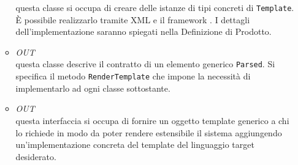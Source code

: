 \begin{itemize}
\begin{itemize}
questa classe si occupa di creare delle istanze di tipi concreti di \texttt{Template}. È possibile realizzarlo tramite XML e il framework \spring. I dettagli dell'implementazione saranno spiegati nella Definizione di Prodotto. %
\item \textit{OUT} \hyperref[\nogloxy{SWEDesigner::Server::Project::ParsedElement}]{}\\
questa classe descrive il contratto di un elemento generico \texttt{Parsed}. Si specifica il metodo \texttt{RenderTemplate} che impone la necessità di implementarlo ad ogni classe sottostante.
\item \textit{OUT} \hyperref[\nogloxy{SWEDesigner::Server::Template::Template}]{}\\
questa interfaccia si occupa di fornire un oggetto template generico a chi lo richiede in modo da poter rendere estensibile il sistema aggiungendo un'implementazione concreta del template del linguaggio target desiderato.
\end{itemize}
\end{itemize}

